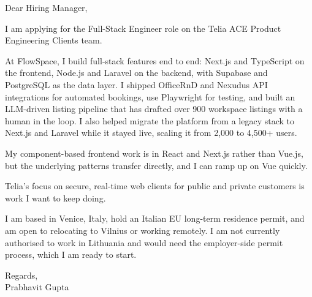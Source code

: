 \documentclass[a4paper,11pt]{article}
\begin{document}
Dear Hiring Manager,

I am applying for the Full-Stack Engineer role on the Telia ACE Product Engineering Clients team.

At FlowSpace, I build full-stack features end to end: Next.js and TypeScript on the frontend, Node.js and Laravel on the backend, with Supabase and PostgreSQL as the data layer. I shipped OfficeRnD and Nexudus API integrations for automated bookings, use Playwright for testing, and built an LLM-driven listing pipeline that has drafted over 900 workspace listings with a human in the loop. I also helped migrate the platform from a legacy stack to Next.js and Laravel while it stayed live, scaling it from 2,000 to 4,500+ users.

My component-based frontend work is in React and Next.js rather than Vue.js, but the underlying patterns transfer directly, and I can ramp up on Vue quickly.

Telia's focus on secure, real-time web clients for public and private customers is work I want to keep doing.

I am based in Venice, Italy, hold an Italian EU long-term residence permit, and am open to relocating to Vilnius or working remotely. I am not currently authorised to work in Lithuania and would need the employer-side permit process, which I am ready to start.

Regards,\\
Prabhavit Gupta
\end{document}
